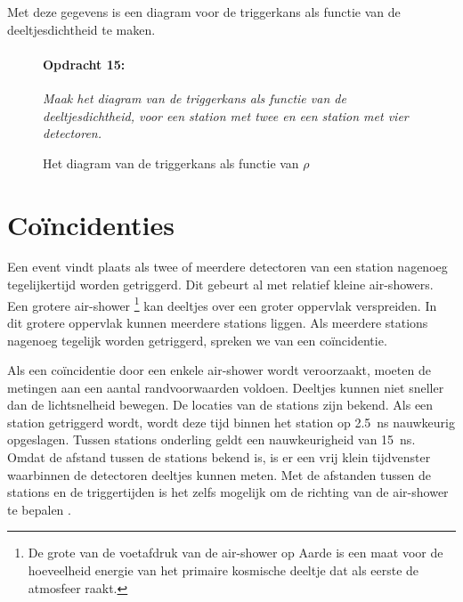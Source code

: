 \bigskip{}


Met deze gegevens is een diagram voor de triggerkans als functie van
de deeltjesdichtheid te maken.

\begin{figure}[h]
    \paragraph{Opdracht 15:}
    \textit{Maak het diagram van de triggerkans als functie van de
            deeltjesdichtheid, voor een station met twee en een station
            met vier detectoren.}
    \bigskip{}
    \bigskip{}

    \caption{Het diagram van de triggerkans als functie van $\rho$}
\end{figure}



\section{Coïncidenties}

Een event vindt plaats als twee of meerdere detectoren van een station
nagenoeg tegelijkertijd worden getriggerd. Dit gebeurt al met relatief
kleine air-showers. Een grotere air-shower%
\footnote{De grote van de voetafdruk van de air-shower op Aarde is een maat
voor de hoeveelheid energie van het primaire kosmische deeltje dat
als eerste de atmosfeer raakt.%
} kan deeltjes over een groter oppervlak verspreiden. In dit grotere
oppervlak kunnen meerdere stations liggen. Als meerdere stations nagenoeg
tegelijk worden getriggerd, spreken we van een coïncidentie. 

Als een coïncidentie door een enkele air-shower wordt veroorzaakt,
moeten de metingen aan een aantal randvoorwaarden voldoen. Deeltjes
kunnen niet sneller dan de lichtsnelheid bewegen. De locaties van
de stations zijn bekend. Als een station getriggerd wordt, wordt deze
tijd binnen het station op \SI{2.5}{\nano\second} nauwkeurig opgeslagen.
Tussen stations onderling geldt een nauwkeurigheid van \SI{15}{\nano\second}.
Omdat de afstand tussen de stations bekend is, is er een vrij klein
tijdvenster waarbinnen de detectoren deeltjes kunnen meten. Met de
afstanden tussen de stations en de triggertijden is het zelfs mogelijk
om de richting van de air-shower te bepalen \cite{veen2013richting}.

